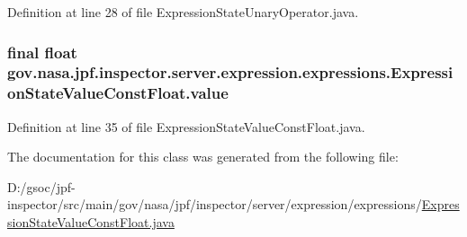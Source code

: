 Definition at line 28 of file Expression\+State\+Unary\+Operator.\+java.

\subsubsection[{\texorpdfstring{value}{value}}]{\setlength{\rightskip}{0pt plus 5cm}final float gov.\+nasa.\+jpf.\+inspector.\+server.\+expression.\+expressions.\+Expression\+State\+Value\+Const\+Float.\+value\hspace{0.3cm}{\ttfamily [private]}}\hypertarget{classgov_1_1nasa_1_1jpf_1_1inspector_1_1server_1_1expression_1_1expressions_1_1_expression_state_value_const_float_a19b7c4061f54cd4ef3121ebb9d6c8e65}{}\label{classgov_1_1nasa_1_1jpf_1_1inspector_1_1server_1_1expression_1_1expressions_1_1_expression_state_value_const_float_a19b7c4061f54cd4ef3121ebb9d6c8e65}


Definition at line 35 of file Expression\+State\+Value\+Const\+Float.\+java.



The documentation for this class was generated from the following file\+:\begin{DoxyCompactItemize}
\item 
D\+:/gsoc/jpf-\/inspector/src/main/gov/nasa/jpf/inspector/server/expression/expressions/\hyperlink{_expression_state_value_const_float_8java}{Expression\+State\+Value\+Const\+Float.\+java}\end{DoxyCompactItemize}
